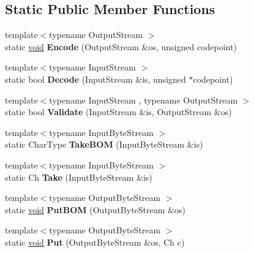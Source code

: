 \subsection*{Static Public Member Functions}
\begin{DoxyCompactItemize}
\item 
\hypertarget{struct_a_s_c_i_i_af56b1605fe233c54693facc7de457f72}{}{\footnotesize template$<$typename Output\+Stream $>$ }\\static \hyperlink{_s_d_l__audio_8h_a52835ae37c4bb905b903cbaf5d04b05f}{void} {\bfseries Encode} (Output\+Stream \&os, unsigned codepoint)\label{struct_a_s_c_i_i_af56b1605fe233c54693facc7de457f72}

\item 
\hypertarget{struct_a_s_c_i_i_a44844bbfd0a4fc282993fd72f3f58eee}{}{\footnotesize template$<$typename Input\+Stream $>$ }\\static bool {\bfseries Decode} (Input\+Stream \&is, unsigned $\ast$codepoint)\label{struct_a_s_c_i_i_a44844bbfd0a4fc282993fd72f3f58eee}

\item 
\hypertarget{struct_a_s_c_i_i_a398680588a09e6ce9b56e32195047c78}{}{\footnotesize template$<$typename Input\+Stream , typename Output\+Stream $>$ }\\static bool {\bfseries Validate} (Input\+Stream \&is, Output\+Stream \&os)\label{struct_a_s_c_i_i_a398680588a09e6ce9b56e32195047c78}

\item 
\hypertarget{struct_a_s_c_i_i_aad78500eb98f45582a4df020e3fb2278}{}{\footnotesize template$<$typename Input\+Byte\+Stream $>$ }\\static Char\+Type {\bfseries Take\+B\+O\+M} (Input\+Byte\+Stream \&is)\label{struct_a_s_c_i_i_aad78500eb98f45582a4df020e3fb2278}

\item 
\hypertarget{struct_a_s_c_i_i_ab1b9fdf0a5c05658d62fded913d923a3}{}{\footnotesize template$<$typename Input\+Byte\+Stream $>$ }\\static Ch {\bfseries Take} (Input\+Byte\+Stream \&is)\label{struct_a_s_c_i_i_ab1b9fdf0a5c05658d62fded913d923a3}

\item 
\hypertarget{struct_a_s_c_i_i_a3036dc1d604039c3224ca0a890ee0134}{}{\footnotesize template$<$typename Output\+Byte\+Stream $>$ }\\static \hyperlink{_s_d_l__audio_8h_a52835ae37c4bb905b903cbaf5d04b05f}{void} {\bfseries Put\+B\+O\+M} (Output\+Byte\+Stream \&os)\label{struct_a_s_c_i_i_a3036dc1d604039c3224ca0a890ee0134}

\item 
\hypertarget{struct_a_s_c_i_i_a218b244b9cd961ea6c5775a734cec20e}{}{\footnotesize template$<$typename Output\+Byte\+Stream $>$ }\\static \hyperlink{_s_d_l__audio_8h_a52835ae37c4bb905b903cbaf5d04b05f}{void} {\bfseries Put} (Output\+Byte\+Stream \&os, Ch c)\label{struct_a_s_c_i_i_a218b244b9cd961ea6c5775a734cec20e}

\end{DoxyCompactItemize}


